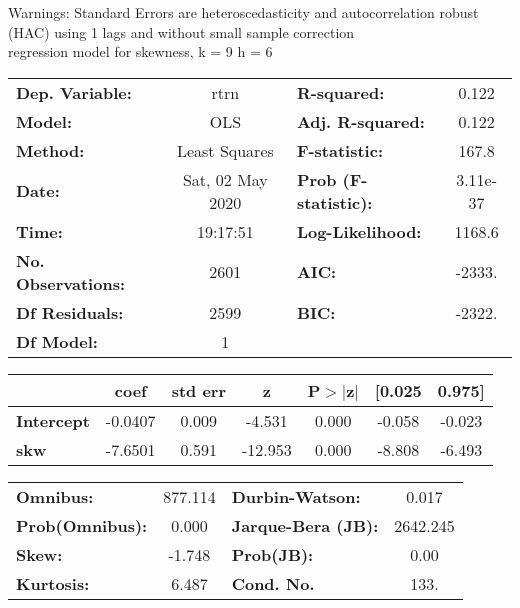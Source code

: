 Warnings: \newline
 [1] Standard Errors are heteroscedasticity and autocorrelation robust (HAC) using 1 lags and without small sample correction\\ 

regression model for skewness, k = 9 h = 6\begin{center}
\begin{tabular}{lclc}
\toprule
\textbf{Dep. Variable:}    &       rtrn       & \textbf{  R-squared:         } &     0.122   \\
\textbf{Model:}            &       OLS        & \textbf{  Adj. R-squared:    } &     0.122   \\
\textbf{Method:}           &  Least Squares   & \textbf{  F-statistic:       } &     167.8   \\
\textbf{Date:}             & Sat, 02 May 2020 & \textbf{  Prob (F-statistic):} &  3.11e-37   \\
\textbf{Time:}             &     19:17:51     & \textbf{  Log-Likelihood:    } &    1168.6   \\
\textbf{No. Observations:} &        2601      & \textbf{  AIC:               } &    -2333.   \\
\textbf{Df Residuals:}     &        2599      & \textbf{  BIC:               } &    -2322.   \\
\textbf{Df Model:}         &           1      & \textbf{                     } &             \\
\bottomrule
\end{tabular}
\begin{tabular}{lcccccc}
                   & \textbf{coef} & \textbf{std err} & \textbf{z} & \textbf{P$> |$z$|$} & \textbf{[0.025} & \textbf{0.975]}  \\
\midrule
\textbf{Intercept} &      -0.0407  &        0.009     &    -4.531  &         0.000        &       -0.058    &       -0.023     \\
\textbf{skw}       &      -7.6501  &        0.591     &   -12.953  &         0.000        &       -8.808    &       -6.493     \\
\bottomrule
\end{tabular}
\begin{tabular}{lclc}
\textbf{Omnibus:}       & 877.114 & \textbf{  Durbin-Watson:     } &    0.017  \\
\textbf{Prob(Omnibus):} &   0.000 & \textbf{  Jarque-Bera (JB):  } & 2642.245  \\
\textbf{Skew:}          &  -1.748 & \textbf{  Prob(JB):          } &     0.00  \\
\textbf{Kurtosis:}      &   6.487 & \textbf{  Cond. No.          } &     133.  \\
\bottomrule
\end{tabular}
\end{center}

